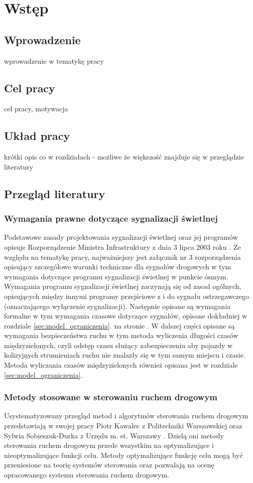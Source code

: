 \chapter{Wstęp}
\section{Wprowadzenie}
wprowadzenie w tematykę pracy
\section{Cel pracy}
cel pracy, motywacja
\section{Układ pracy}
krótki opis co w rozdziałach - możliwe że większość znajduje się w przeglądzie literatury
\section{Przegląd literatury}
\subsection{Wymagania prawne dotyczące sygnalizacji świetlnej}
Podstawowe zasady projektowania sygnalizacji świetlnej oraz jej programów opisuje Rozporządzenie Ministra Infrastruktury z dnia 3 lipca 2003 roku \cite{rozporzadzenie}.
Ze względu na tematykę pracy, najważniejszy jest załącznik nr 3 rozporządzenia opisujący szczegółowe warunki techniczne dla sygnałów drogowych w tym wymagania dotyczące programu sygnalizacji świetlnej w punkcie ósmym.
Wymagania programu sygnalizacji świetlnej zaczynają się od zasad ogólnych, opisujących między innymi programy przejściowe z i do sygnału ostrzegawczego (oznaczającego wyłączenie sygnalizacji). Następnie opisane są wymagania formalne w tym wymagania czasowe dotyczące sygnałów, opisane dokładniej w rozdziale \ref{sec:model_ograniczenia}. na stronie \pageref{sec:model_ograniczenia}.
W dalszej części opisane są wymagania bezpieczeństwa ruchu w tym metoda wyliczenia długości czasów międzyzielonych, czyli odstęp czasu służący zabezpieczeniu aby pojazdy w kolizyjnych strumieniach ruchu nie znalazły się w tym samym miejscu i czasie. Metoda wyliczania czasów międzyzielonych również opisana jest w rozdziale \ref{sec:model_ograniczenia}.

\subsection{Metody stosowane w sterowaniu ruchem drogowym}
Usystematyzowany przegląd metod i algorytmów sterowania ruchem drogowym przedstawiają w swojej pracy Piotr Kawalec z Politechniki Warszawskiej oraz Sylwia Sobieszuk-Durka z Urzędu m. st. Warszawy \cite{kawalec+sobieszuk-durka}. Dzielą oni metody sterowania ruchem drogowym przede wszystkim na optymalizujące i nieoptymalizujące funkcji celu. Metody optymalizujące funkcję celu mogą być przeniesione na teorię systemów sterowania oraz pozwalają na ocenę opracowanego systemu sterowania ruchem drogowym.

